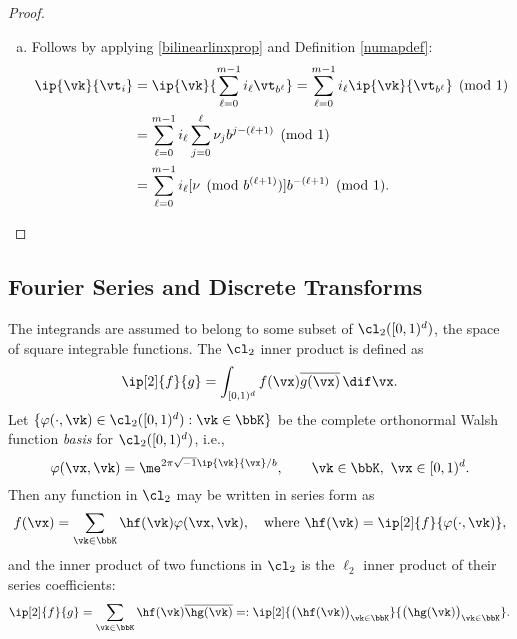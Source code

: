\documentclass[]{elsarticle}
\theoremstyle{definition}
\newcommand{\cube}{[0,1)^d}
\begin{document}
\begin{proof}
\begin{enumerate}[a)]
\item Follows by applying  \eqref{bilinearlinxprop} and Definition \ref{numapdef}:
\begin{align*}
\ip{\vk}{\vt_i} &= \ip{\vk}{\sum_{\ell=0}^{m-1} i_\ell \vt_{b^{\ell}}} = \sum_{\ell=0}^{m-1} i_\ell \ip{\vk}{\vt_{b^{\ell}}} \pmod 1 \\
& = \sum_{\ell=0}^{m-1} i_\ell \sum_{j=0}^{\ell} \nu_jb^{j-(\ell+1)} \pmod 1\\
&=\sum_{\ell=0}^{m-1} i_\ell [\nu \pmod  {b^{(\ell+1)}}]  b^{-(\ell+1)} \pmod 1.
\end{align*}

\end{enumerate}
\end{proof}

\subsection{Fourier Series and Discrete Transforms}

The integrands are assumed to belong to some subset of $\cl_2(\cube)$, the space of square integrable functions.  The $\cl_2$ inner product is defined as
\[
\ip[2]{f}{g} = \int_{\cube} f(\vx) \overline{g(\vx)} \, \dif \vx.
\]
Let $\{\varphi(\cdot,\vk) \in \cl_2(\cube) : \vk \in \bbK\}$ be the complete orthonormal Walsh function \emph{basis} for $\cl_2(\cube)$, i.e.,
\[
\varphi(\vx,\vk)  = \me^{2 \pi \sqrt{-1} \ip{\vk}{\vx}/b}, \qquad \vk \in \bbK, \ \vx \in \cube.
\]
Then any function in $\cl_2$ may be written in series form as
\begin{equation} \label{Fourierdef}
f(\vx) = \sum_{\vk \in \bbK} \hf(\vk) \varphi(\vx,\vk), \quad \text{where } \hf(\vk) = \ip[2]{f}{\varphi(\cdot,\vk)},
\end{equation}
and the inner product of two functions in $\cl_2$ is the $\ell_2$ inner product of their series coefficients:
\[
\ip[2]{f}{g} = \sum_{\vk \in \bbK} \hf(\vk)\overline{\hg(\vk)} =: \ip[2]{\bigl(\hf(\vk)\bigr)_{\vk \in \bbK}}{\bigl ( \hg(\vk)\bigr )_{\vk \in \bbK}}.
\]
\end{document}
